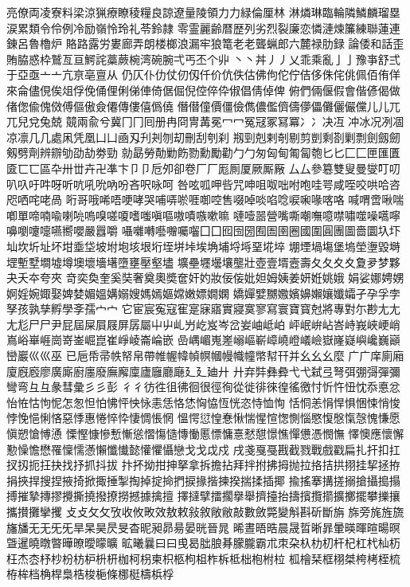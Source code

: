 亮僚両凌寮料梁涼猟療瞭稜糧良諒遼量陵領⼒力緑倫厘林
淋燐琳臨輪隣鱗麟瑠塁涙累類令伶例冷励嶺怜玲礼苓鈴隷
零霊麗齢暦歴列劣烈裂廉恋憐漣煉簾練聯蓮連錬呂魯櫓炉
賂路露労婁廊弄朗楼榔浪漏牢狼篭⽼老聾蝋郎六麓禄肋録
論倭和話歪賄脇惑枠鷲亙亘鰐詫藁蕨椀湾碗腕弌丐丕个丱
⼂丶丼⼃丿乂乖乘亂⼅亅豫亊舒弍于亞亟⼇亠亢亰亳亶从
仍仄仆仂仗仞仭仟价伉佚估佛佝佗佇佶侈侏侘佻佩佰侑佯
來侖儘俔俟俎俘俛俑俚俐俤俥倚倨倔倪倥倅伜俶倡倩倬俾
俯們倆偃假會偕偐偈做偖偬偸傀傚傅傴傲僉僊傳僂僖僞僥
僭僣僮價僵儉儁儂儖儕儔儚儡儺儷儼儻⼉儿⺎兀兒兌兔兢
竸兩兪兮冀⼌冂囘册冉冏冑冓冕⼍冖冤冦冢冩冪⼎冫决冱
冲冰况冽凅凉凛⼏几處凩凭凰⼐凵凾刄刋刔刎刧刪刮刳刹
剏剄剋剌剞剔剪剴剩剳剿剽劍劔劒剱劈劑辨辧劬劭劼劵勁
勍勗勞勣勦飭勠勳勵勸⼓勹匆匈甸匍匐匏匕⼔匚⼕匣匯匱
匳⼖匸區卆卅丗卉卍凖卞⼙卩卮夘卻卷⼚厂厖厠厦厥厮厰
⼛厶參簒雙叟曼燮叮叨叭叺吁吽呀听吭吼吮吶吩吝呎咏呵
咎呟呱呷呰咒呻咀呶咄咐咆哇咢咸咥咬哄哈咨咫哂咤咾咼
哘哥哦唏唔哽哮哭哺哢唹啀啣啌售啜啅啖啗唸唳啝喙喀咯
喊喟啻啾喘喞單啼喃喩喇喨嗚嗅嗟嗄嗜嗤嗔嘔嗷嘖嗾嗽嘛
嗹噎噐營嘴嘶嘲嘸噫噤嘯噬噪嚆嚀嚊嚠嚔嚏嚥嚮嚶嚴囂嚼
囁囃囀囈囎囑囓⼞囗囮囹圀囿圄圉圈國圍圓團圖嗇圜圦圷
圸坎圻址坏坩埀垈坡坿垉垓垠垳垤垪垰埃埆埔埒埓堊埖埣
堋堙堝塲堡塢塋塰毀塒堽塹墅墹墟墫墺壞墻墸墮壅壓壑壗
壙壘壥壜壤壟壯壺壹壻壼壽夂⼡夊⼢夐夛梦夥夬夭夲夸夾
竒奕奐奎奚奘奢奠奧奬奩奸妁妝佞侫妣妲姆姨姜妍姙姚娥
娟娑娜娉娚婀婬婉娵娶婢婪媚媼媾嫋嫂媽嫣嫗嫦嫩嫖嫺嫻
嬌嬋嬖嬲嫐嬪嬶嬾孃孅孀孑孕孚孛孥孩孰孳孵學斈孺⼧宀
它宦宸寃寇寉寔寐寤實寢寞寥寫寰寶寳尅將專對尓尠⺐⼪
尢尨⼫尸尹屁屆屎屓屐屏孱屬⼬屮乢屶屹岌岑岔妛岫岻岶
岼岷峅岾峇峙峩峽峺峭嶌峪崋崕崗嵜崟崛崑崔崢崚崙崘嵌
嵒嵎嵋嵬嵳嵶嶇嶄嶂嶢嶝嶬嶮嶽嶐嶷嶼巉巍巓巒巖⼮巛巫
已巵帋帚帙帑帛帶帷幄幃幀幎幗幔幟幢幤幇幵并⺓⼳幺麼
⼴广庠廁廂廈廐廏廖廣廝廚廛廢廡廨廩廬廱廳廰⼵廴廸⼶
廾弃弉彝彜⼷弋弑弖弩弭弸彁彈彌彎弯⺔彑彖彗彙⼺彡彭
⼻彳彷徃徂彿徊很徑徇從徙徘徠徨徭徼忖忻忤忸忱忝悳忿
怡恠怙怐怩怎怱怛怕怫怦怏怺恚恁恪恷恟恊恆恍恣恃恤恂
恬恫恙悁悍惧悃悚悄悛悖悗悒悧悋惡悸惠惓悴忰悽惆悵惘
慍愕愆惶惷愀惴惺愃愡惻惱愍愎慇愾愨愧慊愿愼愬愴愽慂
慄慳慷慘慙慚慫慴慯慥慱慟慝慓慵憙憖憇憬憔憚憊憑憫憮
懌懊應懷懈懃懆憺懋罹懍懦懣懶懺懴懿懽懼懾戀⼽戈戉戍
戌戔戛戞戡截戮戰戲戳扁扎扞扣扛扠扨扼抂抉找抒抓抖拔
抃抔拗拑抻拏拿拆擔拈拜拌拊拂拇抛拉挌拮拱挧挂挈拯拵
捐挾捍搜捏掖掎掀掫捶掣掏掉掟掵捫捩掾揩揀揆揣揉插揶
揄搖搴搆搓搦搶攝搗搨搏摧摯摶摎攪撕撓撥撩撈撼據擒擅
擇撻擘擂擱擧舉擠擡抬擣擯攬擶擴擲擺攀擽攘攜攅攤攣攫
⽁攴⺙攵攷收攸畋效敖敕敍敘敞敝敲數斂斃變斛斟斫斷旃
旆旁旄旌旒旛旙⽆无⺛旡旱杲昊昃旻杳昵昶昴昜晏晄晉晁
晞晝晤晧晨晟晢晰暃暈暎暉暄暘暝曁暹曉暾暼曄暸曖曚曠
昿曦曩⽈曰曵曷朏朖朞朦朧霸朮朿朶杁朸朷杆杞杠杙杣杤
枉杰枩杼杪枌枋枦枡枅枷柯枴柬枳柩枸柤柞柝柢柮枹柎柆
柧檜栞框栩桀桍栲桎梳栫桙档桷桿梟梏梭梔條梛梃檮梹桴
